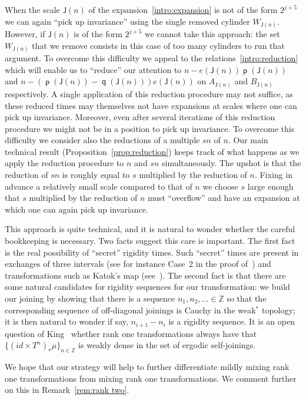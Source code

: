 \documentclass[AHL,Unicode,longabstracts,published]{cedram}
\DeclareMathOperator{\p}{\mathsf{p}}
\DeclareMathOperator{\q}{\mathsf{q}}
\newcommand{\Z}{\mathbb{Z}}
\newcommand{\scl}{\mathsf{J}}
\begin{document}
When the scale $\scl(n)$ of the expansion~\eqref{intro:expansion} is not of the form $2^{j+5}$ we can again ``pick up invariance'' using the single removed cylinder $W_{\scl(n)}$. However, if $\scl(n)$ is of the form $2^{j+5}$ we cannot take this approach: the set $W_{\scl(n)}$ that we remove consists in this case of too many cylinders to run that argument. To overcome this difficulty we appeal to the relations~\eqref{intro:reduction} which will enable us to ``reduce'' our attention to $n - e(\scl(n)) \p(\scl(n))$ and $n - (\p(\scl(n)) - \q(\scl(n))) e(\scl(n))$ on $A_{\scl(n)}$ and $B_{\scl(n)}$ respectively. A single application of this reduction procedure may not suffice, as these reduced times may themselves not have expansions at scales where one can pick up invariance. Moreover, even after several iterations of this reduction procedure we might not be in a position to pick up invariance. To overcome this difficulty we consider also the reductions of a multiple $sn$ of $n$. Our main technical result (Proposition~\ref{prop:reduction}) keeps track of what happens as we apply the reduction procedure to $n$ and $sn$ simultaneously. The upshot is that the reduction of $sn$ is roughly equal to $s$ multiplied by the reduction of $n$. Fixing in advance a relatively small scale compared to that of $n$ we choose $s$ large enough that $s$ multiplied by the reduction of $n$ must ``overflow'' and have an expansion at which one can again pick up invariance.

This approach is quite technical, and it is natural to wonder whether the careful bookkeeping is necessary. Two facts suggest this care is important. The first fact is the real possibility of ``secret'' rigidity times. Such ``secret'' times are present in exchanges of three intervals (see for instance Case~2 in the proof of~\cite[Theorem~5.1]{MR2129107}) and transformations such as Katok's map (see~\cite[Section~1.4.3]{MR1436950}). The second fact is that there are some natural candidates for rigidity sequences for our transformation: we build our joining by showing that there is a sequence $n_1,n_2,\ldots\in \Z$ so that the corresponding sequence of off-diagonal joinings is Cauchy in the weak$^*$ topology; it is then natural to wonder if say, ${n_{i+1}-n_i}$ is a rigidity sequence. It is an open question of King~\cite[p.~382]{MR0863200} whether rank one transformations always have that $\{(id \times T^n)_*\mu\}_{n \in \Z}$ is weakly dense in the set of ergodic self-joinings.

We hope that our strategy will help to further differentiate mildly mixing rank one transformations from mixing rank one transformations. We comment further on this in Remark~\ref{rem:rank two}.
\end{document}
